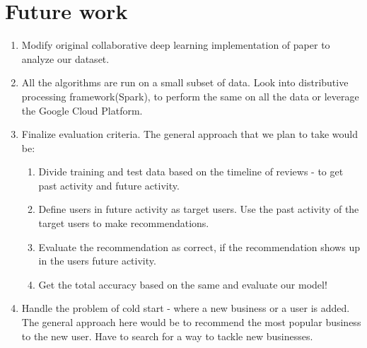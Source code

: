 \documentclass[11pt]{article}
\begin{document}
	\section{Future work}
	\begin{enumerate}
		\item Modify original collaborative deep learning implementation\cite{cdli} of paper \cite{cdl} to analyze our dataset.
		\item All the algorithms are run on a small subset of data. Look into distributive processing framework(Spark), to perform the same on all the data or leverage the Google Cloud Platform.
		\item Finalize evaluation criteria. The general approach that we plan to take would be:
		\begin{enumerate}
			\item Divide training and test data based on the timeline of reviews - to get past activity and future activity.
			\item Define users in future activity as target users. Use the past activity of the target users to make recommendations.
			\item Evaluate the recommendation as correct, if the recommendation shows up in the users future activity.
			\item Get the total accuracy based on the same and evaluate our model!
		\end{enumerate}
		\item Handle the problem of cold  start - where a new business or a user is added. The general approach here would be to recommend the most popular business to the new user. Have to search for a way to tackle new businesses.
		
	\end{enumerate}
	
\end{document}
